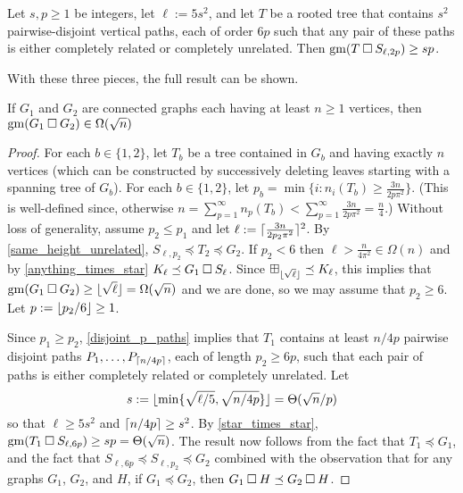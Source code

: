 \documentclass[../main.tex]{subfiles}
\begin{document}
	\begin{lem}\label{star_times_star}
		Let $s,p\ge 1$ be integers, let $\ell:=5s^2$, and let $T$ be a rooted tree that contains $s^2$ pairwise-disjoint vertical paths, each of order $6p$ such that any pair of these paths is either completely related or completely unrelated.  Then $\operatorname{gm}(T\mathbin{\Box} S_{\ell,2p})\ge sp$.
	\end{lem}
	
	With these three pieces, the full result can be shown.
	
	\begin{thm}\label{lower_bound}
		If $G_1$ and $G_2$ are connected graphs each having at least $n\ge 1$ vertices, then $\operatorname{gm}(G_1\mathbin{\Box} G_2)\in\Omega(\sqrt{n})$
	\end{thm}
	
	\begin{proof}
		For each $b\in\{1,2\}$, let $T_b$ be a tree contained in $G_b$ and having exactly $n$ vertices (which can be constructed by successively deleting leaves starting with a spanning tree of $G_b$).  
		For each $b\in\{1,2\}$, let $p_b=\min\{i: n_i(T_b)\ge \tfrac{3n}{2p\pi^2}\}$.  (This is well-defined since, otherwise $n=\sum_{p=1}^\infty n_p(T_b) < \sum_{p=1}^\infty \tfrac{3n}{2p\pi^2} = \frac{n}{4}$.)  Without loss of generality, assume $p_2 \le p_1$ and let $\ell:=\lceil\tfrac{3n}{2p_2\pi^2}\rceil^2$. By \cref{same_height_unrelated}, $S_{\ell,p_2}\preceq T_2\preceq G_2$.  If $p_2 < 6$ then $\ell > \frac{n}{4\pi^2}\in\Omega(n)$ and by \cref{anything_times_star} $K_{\ell}\preceq G_1 \mathbin{\Box} S_\ell$.  Since $\boxplus_{\lfloor\sqrt{\ell}\rfloor}\preceq K_{\ell}$, this implies that $\operatorname{gm}(G_1\mathbin{\Box} G_2)\ge \lfloor\sqrt{\ell}\rfloor=\Omega(\sqrt{n})$ and we are done, so we may assume that $p_2\ge 6$. Let $p:=\lfloor p_2/6\rfloor\ge 1$.
		
		Since $p_1\ge p_2$, \cref{disjoint_p_paths} implies that $T_1$ contains at least $n/4p$ pairwise disjoint paths $P_1,\ldots,P_{\lceil n/4p\rceil}$, each of length $p_2\ge 6p$, such that each pair of paths is either completely related or completely unrelated.  Let
		\[
		s:=\lfloor\min\{\sqrt{\ell/5}, \sqrt{n/4p}\}\rfloor = \Theta(\sqrt{n}/p)
		\]
		so that $\ell \ge 5s^2$ and $\lceil n/4p\rceil\ge s^2$.  By \cref{star_times_star}, $\operatorname{gm}(T_1 \mathbin{\Box} S_{\ell,6p}) \ge sp=\Theta(\sqrt{n})$.  The result now follows from  the fact that $T_1\preceq G_1$, and the fact that $S_{\ell,6p}\preceq S_{\ell,p_2}\preceq G_2$ combined with the observation that for any graphs $G_1$, $G_2$, and $H$, if $G_1\preceq G_2$, then $G_1\mathbin{\Box} H\preceq G_2\mathbin{\Box} H$.
	\end{proof}
	
\end{document}
